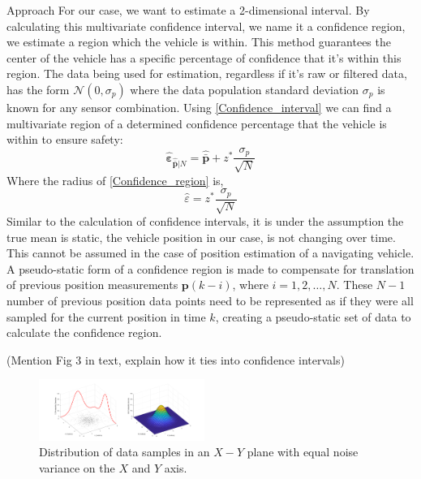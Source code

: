 \begin{section}{Approach}
For our case, we want to estimate a 2-dimensional interval. By calculating this multivariate confidence interval, we name it a confidence region, we estimate a region which the vehicle is within. This method guarantees the center of the vehicle has a specific percentage of confidence that it's within this region. The data being used for estimation, regardless if it's raw or filtered data, has the form $\mathcal{N}(0,\sigma_p)$ where the data population standard deviation $\sigma_p$ is known for any sensor combination. Using \eqref{Confidence_interval} we can find a multivariate region of a determined confidence percentage that the vehicle is within to ensure safety:
    \begin{equation}
    \label{Confidence_region}
		\hat{\bm{\varepsilon}}_{\hat{\bar{\bm{p}}}|N} = \hat{\bar{\bm{p}}} + z^{*}\frac{\sigma_p}{\sqrt{N}}
	\end{equation}
Where the radius of \eqref{Confidence_region} is,
    \begin{equation}
		\hat{\varepsilon} = z^{*}\frac{\sigma_p}{\sqrt{N}}
	\end{equation}
Similar to the calculation of confidence intervals, it is under the assumption the true mean is static, the vehicle position in our case, is not changing over time. This cannot be assumed in the case of position estimation of a navigating vehicle. A pseudo-static form of a confidence region is made to compensate for translation of previous position measurements $\bm{p}(k-i)$, where $i=1,2,\dots,N$. These $N-1$ number of previous position data points need to be represented as if they were all sampled for the current position in time $k$, creating a pseudo-static set of data to calculate the confidence region. 

(Mention Fig 3 in text, explain how it ties into confidence intervals)
\begin{figure}[ht!]
\vspace{1pt}
\centering
\includegraphics[width=0.48\textwidth]{GaussianPDF.png}
\caption{Distribution of data samples in an $X-Y$ plane with equal noise variance on the $X$ and $Y$ axis.}
\label{fig:gauss_pdf}
\end{figure}


\end{section}
